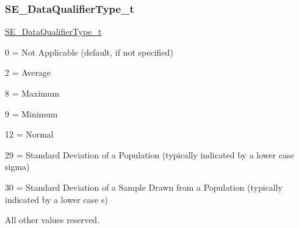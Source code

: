 \subsubsection{\texorpdfstring{S\+E\+\_\+\+Data\+Qualifier\+Type\+\_\+t}{SE\_DataQualifierType\_t}}
{\footnotesize\ttfamily \hyperlink{group__DataQualifierType_gad1c718c173804210c9562a1ef63a9bf6}{S\+E\+\_\+\+Data\+Qualifier\+Type\+\_\+t}}

0 = Not Applicable (default, if not specified)

2 = Average

8 = Maximum

9 = Minimum

12 = Normal

29 = Standard Deviation of a Population (typically indicated by a lower case sigma)

30 = Standard Deviation of a Sample Drawn from a Population (typically indicated by a lower case \textquotesingle{}s\textquotesingle{})

All other values reserved. 